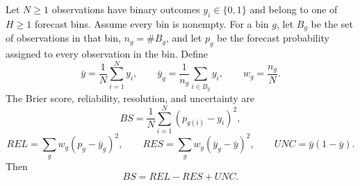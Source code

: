 \begin{theorem}
Let $N\ge 1$ observations have binary outcomes $y_i\in\{0,1\}$ and belong to
one of $H\ge 1$ forecast bins. Assume every bin is nonempty. For a bin $g$,
let $B_g$ be the set of observations in that bin, $n_g=\#B_g$, and let $p_g$
be the forecast probability assigned to every observation in the bin. Define
\[
\bar y=\frac1N\sum_{i=1}^N y_i,\qquad
\bar y_g=\frac1{n_g}\sum_{i\in B_g} y_i,\qquad
w_g=\frac{n_g}{N}.
\]
The Brier score, reliability, resolution, and uncertainty are
\[
BS=\frac1N\sum_{i=1}^N (p_{g(i)}-y_i)^2,
\]
\[
REL=\sum_g w_g(p_g-\bar y_g)^2,\qquad
RES=\sum_g w_g(\bar y_g-\bar y)^2,\qquad
UNC=\bar y(1-\bar y).
\]
Then
\[
BS=REL-RES+UNC.
\]
\end{theorem}
